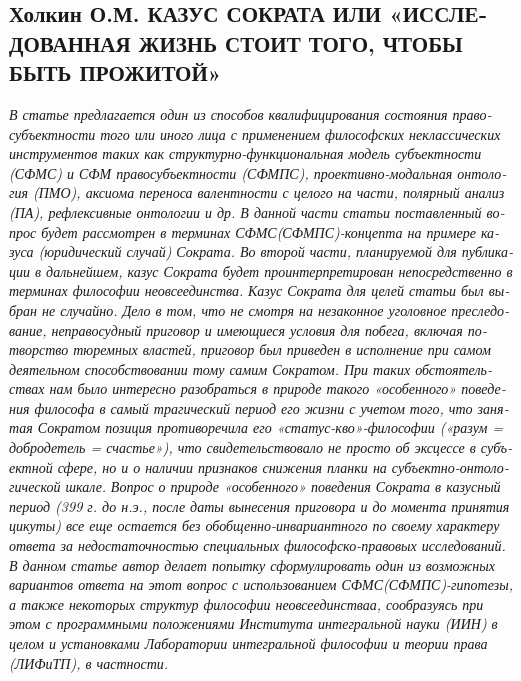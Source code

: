 \else
    \begin{russian}
    \subsection{\texorpdfstring{\textbf{Холкин О.М. КАЗУС СОКРАТА ИЛИ «ИССЛЕДОВАННАЯ ЖИЗНЬ СТОИТ ТОГО, ЧТОБЫ БЫТЬ ПРОЖИТОЙ»}}{Холкин О.М. КАЗУС СОКРАТА ИЛИ «ИССЛЕДОВАННАЯ ЖИЗНЬ СТОИТ ТОГО, ЧТОБЫ БЫТЬ ПРОЖИТОЙ»}}
    \label{subsec:holkin-ru}

    \textit{В статье предлагается один из способов квалифицирования состояния правосубъектности того или иного лица с применением философских неклассических инструментов таких как структурно-функциональная модель субъектности (СФМС) и СФМ правосубъектности (СФМПС), проективно-модальная онтология (ПМО), аксиома переноса валентности с целого на части, полярный анализ (ПА), рефлексивные онтологии и др. В данной части статьи поставленный вопрос будет рассмотрен в терминах СФМС(СФМПС)-концепта на примере казуса (юридический случай) Сократа. Во второй части, планируемой для публикации в дальнейшем, казус Сократа будет проинтерпретирован непосредственно в терминах философии неовсеединства.  }
    \textit{Казус Сократа для целей статьи был выбран не случайно. Дело в том, что не смотря на незаконное уголовное преследование, неправосудный приговор и имеющиеся условия для побега, включая потворство тюремных властей, приговор был приведен в исполнение при самом деятельном способствовании тому самим Сократом. При таких обстоятельствах нам было интересно разобраться в природе такого «особенного» поведения философа в самый трагический период его жизни с учетом того, что занятая Сократом позиция противоречила его  «статус-кво»-философии («разум = добродетель = счастье»), что свидетельствовало не просто об эксцессе в субъектной сфере, но и о наличии признаков  снижения планки на субъектно-онтологической шкале. } 
    \textit{Вопрос о природе «особенного» поведения Сократа в казусный период (399 г. до н.э., после даты вынесения приговора и до момента принятия цикуты) все еще остается без обобщенно-инвариантного по своему характеру ответа за недостаточностью специальных философско-правовых исследований. } 
    \textit{В данном статье автор делает попытку сформулировать один из возможных вариантов ответа на этот вопрос с использованием СФМС(СФМПС)-гипотезы, а также некоторых структур философии неовсеединстваа, сообразуясь при этом с программными положениями Института интегральной науки (ИИН) в целом и установками Лаборатории интегральной философии и теории права (ЛИФиТП), в частности.} 


\end{russian}
